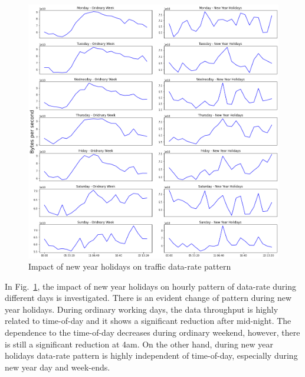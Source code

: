 \documentclass[10pt, journal, letterpaper]{IEEEtran}
\begin{document}
\begin{figure}
    \centering
    \includegraphics[width=\columnwidth]{img/BCH_CH2_hourly_compare_bps.png}
    \caption{Impact of new year holidays on traffic data-rate pattern}
    \label{fig:BCH_CH2_hourly_bps}
\end{figure}
In Fig.~\ref{fig:BCH_CH2_hourly_bps}, the impact of new year holidays on hourly pattern of data-rate during different days is investigated. There is an evident change of pattern during new year holidays. During ordinary working days, the data throughput is highly related to time-of-day and it shows a significant reduction after mid-night. The dependence to the time-of-day decreases during ordinary weekend, however, there is still a significant reduction at 4am. On the other hand, during new year holidays data-rate pattern is highly independent of time-of-day, especially during new year day and week-ends.
\end{document}
